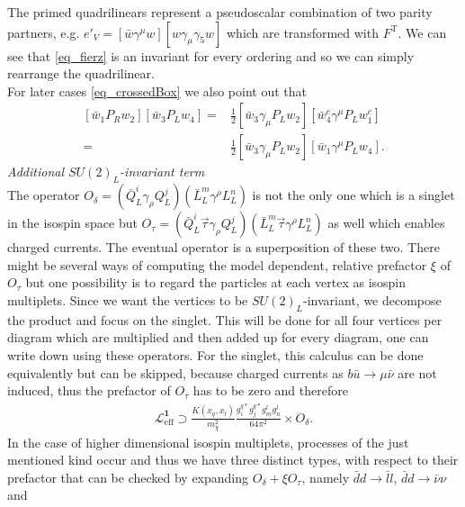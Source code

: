 The primed quadrilinears represent a pseudoscalar combination of two parity partners, e.g. $e'_V = \left[\bar w\gamma^\mu w\right]\left[w\gamma_\mu\gamma_5w\right]$
which are transformed with $F^\text{T}$. We can see that \eqref{eq_fierz} is an invariant for every ordering and so we can simply rearrange the quadrilinear.
\\ \noindent For later cases \eqref{eq_crossedBox} we also point out that 
\begin{subequations}
\begin{align}
 \left[\bar w_1 P_R w_2\right]\left[\bar w_3 P_L w_4\right] =& \frac12  \left[\bar w_3 \gamma_\mu P_L w_2\right]\left[\bar w^c_4 \gamma^\mu P_L w_1^c\right]\\
 =& \frac12  \left[\bar w_3 \gamma_\mu P_L w_2\right]\left[\bar w_1 \gamma^\mu P_L w_4\right].
 \label{eq_fierzSPtoVA}
\end{align} 
\end{subequations}
 \noindent \textit{Additional $SU(2)_L$-invariant term}\\
\noindent The operator $O_\delta=\left(\bar Q_L^i \gamma_\rho Q_L^j\right)\left(\bar L_L^m \gamma^\rho L_L^n\right)$ is not the only one which is a singlet
in the isospin space but $O_\tau=\left(\bar Q_L^i\vec \tau \gamma_\rho Q_L^j\right)\left(\bar L_L^m\vec \tau \gamma^\rho L_L^n\right)$ as well which enables
charged currents. The eventual operator is a superposition of these two. There might be several ways of computing the model dependent, relative 
prefactor $\xi$ of $O_\tau$  but one possibility is to regard the particles at each vertex as isospin multiplets. Since we want the vertices to be 
$SU(2)_L$-invariant, we 
decompose the product and focus on the singlet. This will be done for all four vertices per diagram which are multiplied and then added up for every diagram,
one can write down using these operators. For the singlet, this calculus can be done equivalently but can be skipped, because charged currents as 
$b \bar u \rightarrow \mu \bar \nu$ are not induced, thus the prefactor of $O_\tau$ has to be zero and therefore 
\begin{align}
  \mathcal{L}^{\textbf{1}}_\text{eff} \supset \frac{K(x_q,x_l)}{m_\chi^2}\frac{g_i^{q*} g_j^{q*} g_m^l g_n^l}{64\pi^2} \times O_\delta.
 \label{eq_LagBSmumuModA}
\end{align}
In the case of higher dimensional isospin multiplets, processes of the just mentioned kind occur and thus we have three distinct types, with respect to 
their prefactor that can be checked by expanding $O_\delta + \xi O_\tau$, namely $\bar d d\rightarrow \bar l l$, $\bar d d \rightarrow \bar\nu \nu$ and 

